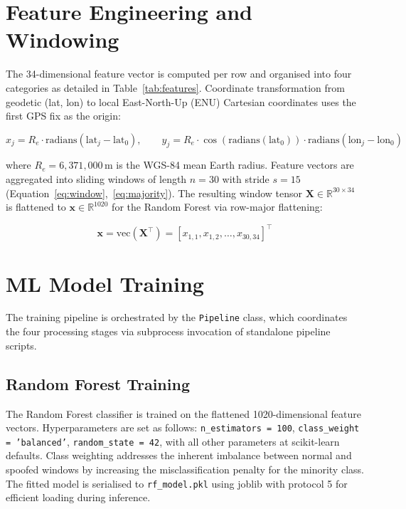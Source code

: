 \section{Feature Engineering and Windowing}\label{sec:implem_fe}

The 34-dimensional feature vector is computed per row and organised into four categories as detailed in Table~\ref{tab:features}. Coordinate transformation from geodetic (lat, lon) to local East-North-Up (ENU) Cartesian coordinates uses the first GPS fix as the origin:

\begin{equation}
    x_j = R_e \cdot \text{radians}(\text{lat}_j - \text{lat}_0), \qquad
    y_j = R_e \cdot \cos(\text{radians}(\text{lat}_0)) \cdot \text{radians}(\text{lon}_j - \text{lon}_0)
    \label{eq:enu}
\end{equation}

where \(R_e = 6,371,000\)\,m is the WGS-84 mean Earth radius. Feature vectors are aggregated into sliding windows of length \(n = 30\) with stride \(s = 15\) (Equation~\ref{eq:window},~\ref{eq:majority}). The resulting window tensor \(\mathbf{X} \in \mathbb{R}^{30 \times 34}\) is flattened to \(\mathbf{x} \in \mathbb{R}^{1020}\) for the Random Forest via row-major flattening:

\begin{equation}
    \mathbf{x} = \text{vec}(\mathbf{X}^\top) = [x_{1,1}, x_{1,2}, \dots, x_{30,34}]^\top
    \label{eq:flatten}
\end{equation}

\section{ML Model Training}

The training pipeline is orchestrated by the \texttt{Pipeline} class, which coordinates the four processing stages via subprocess invocation of standalone pipeline scripts.

\subsection{Random Forest Training}

The Random Forest classifier is trained on the flattened 1020-dimensional feature vectors. Hyperparameters are set as follows: \texttt{n\_estimators = 100}, \texttt{class\_weight = 'balanced'}, \texttt{random\_state = 42}, with all other parameters at scikit-learn defaults. Class weighting addresses the inherent imbalance between normal and spoofed windows by increasing the misclassification penalty for the minority class. The fitted model is serialised to \texttt{rf\_model.pkl} using joblib with protocol 5 for efficient loading during inference.

